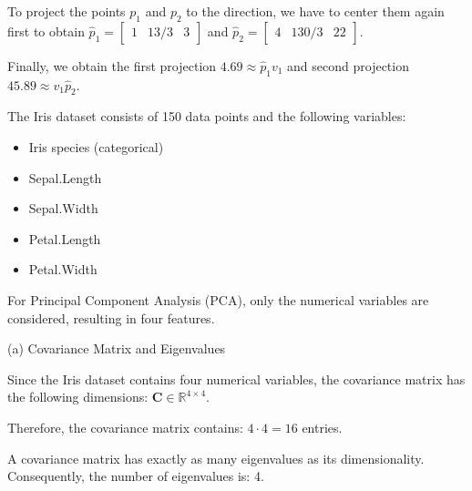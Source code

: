 \begin{exercise}[Warmup]
\begin{enumerate}
            To project the points \(p_1\) and \(p_2\) to the direction, we have to center them again first to obtain \(\hat p_1 = \begin{bmatrix}1 & 13/3 & 3\end{bmatrix}\) and \(\hat p_2 = \begin{bmatrix}4 & 130/3 & 22\end{bmatrix}\).

            Finally, we obtain the first projection \(4.69 \approx \hat p_1 v_1\) and second projection \(45.89 \approx v_1 \hat p_2\).
        \end{enumerate}
    \end{exercise}

    \begin{exercise}[Data]
    The Iris dataset consists of 150 data points and the following variables:
    \begin{itemize}
        \item Iris species (categorical)
        \item Sepal.Length
        \item Sepal.Width
        \item Petal.Length
        \item Petal.Width
    \end{itemize}

    For Principal Component Analysis (PCA), only the numerical variables are considered, resulting in four features.

    (a) Covariance Matrix and Eigenvalues

    Since the Iris dataset contains four numerical variables, the covariance matrix has the following dimensions:
    \(\mathbf{C} \in \mathbb{R}^{4 \times 4}\).
    

    Therefore, the covariance matrix contains:
    \(4 \cdot 4 = 16\)
    entries.

    A covariance matrix has exactly as many eigenvalues as its dimensionality. Consequently, the number of eigenvalues is: 4.
    \end{exercise}

